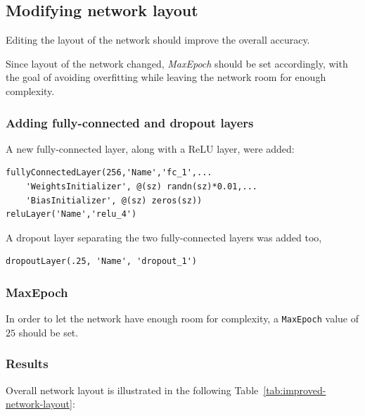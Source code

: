 \documentclass[a4paper, 11pt]{article} %
\begin{document}
\subsection{Modifying network layout}

Editing the layout of the network should improve the overall accuracy.

Since layout of the network changed, \emph{MaxEpoch} should be set accordingly, with the goal of avoiding overfitting while leaving the network room for enough complexity.

\subsubsection{Adding fully-connected and dropout layers}

A new fully-connected layer, along with a ReLU layer, were added:

\begin{lstlisting}
fullyConnectedLayer(256,'Name','fc_1',...
    'WeightsInitializer', @(sz) randn(sz)*0.01,...
    'BiasInitializer', @(sz) zeros(sz))
reluLayer('Name','relu_4')
\end{lstlisting}

A dropout layer separating the two fully-connected layers was added too,

\begin{lstlisting}
dropoutLayer(.25, 'Name', 'dropout_1')
\end{lstlisting}

\subsubsection{MaxEpoch}

In order to let the network have enough room for complexity, a \texttt{MaxEpoch} value of $25$ should be set.

\subsubsection{Results}\label{sec:results}

Overall network layout is illustrated in the following Table~\ref{tab:improved-network-layout}:
\end{document}
